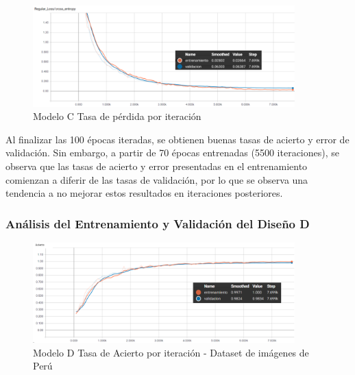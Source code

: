 			
			\begin{figure}[H]
				\begin{center}
				\includegraphics[width=0.9\textwidth]{images/desarrollo/trainResults/peru/modelCLoss} 
				\end{center}
				\begin{center}
				\caption{\small{Modelo C Tasa de pérdida por iteración}}
				
				{\small{\fontsize{10}{16.8}\selectfont {Fuente: Elaboración propia}}}
				\end{center}
				\vspace{-1.5em}
			\end{figure}

			Al finalizar las 100 épocas iteradas, se obtienen buenas tasas de acierto y error de validación. Sin embargo, a partir de 70 épocas entrenadas (5500 iteraciones), se observa que las tasas de acierto y error presentadas en el entrenamiento comienzan a diferir de las tasas de validación, por lo que se observa una tendencia a no mejorar estos resultados en iteraciones posteriores.

		\subsubsection{Análisis del Entrenamiento y Validación del Diseño D} 
			\begin{figure}[H]
				\begin{center}
				\includegraphics[width=0.9\textwidth]{images/desarrollo/trainResults/peru/modelDAcierto} 
				\end{center}
				\begin{center}
				\caption{\small{Modelo D Tasa de Acierto por iteración - Dataset de imágenes de Perú  }}
				
				{\small{\fontsize{10}{16.8}\selectfont {Fuente: Elaboración propia}}}
				\end{center}
				\vspace{-1.5em}
			\end{figure}
			
